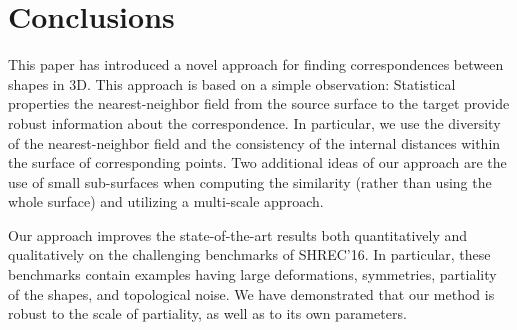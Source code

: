 \chapter{Conclusions}\label{chap:Conclusions}

This paper has introduced a novel approach for finding correspondences between shapes in 3D.
This approach is based on a simple observation:
Statistical properties the nearest-neighbor field from the source surface to the target provide robust information about the correspondence.
In particular, we use the diversity of the nearest-neighbor field and the consistency of the internal distances within the surface of corresponding points. 
Two additional ideas of our approach are the use of small sub-surfaces when computing the similarity (rather than using the whole surface) and utilizing a multi-scale approach.

Our approach improves the state-of-the-art results both quantitatively and qualitatively on the challenging benchmarks of SHREC'16.
In particular, these benchmarks contain examples having large deformations, symmetries, partiality of the shapes, and topological noise.
We have demonstrated that our method is robust to the scale of partiality, as well as to its own parameters.
